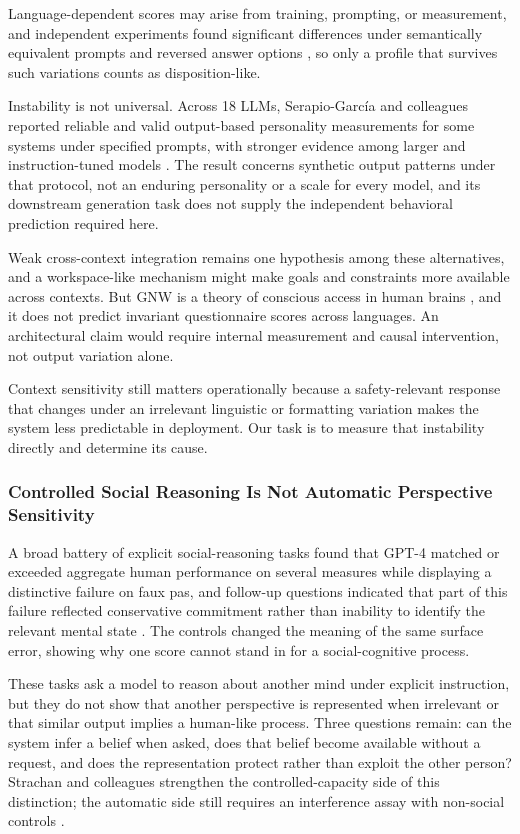 \documentclass{article}
\begin{document}
Language-dependent scores may arise from training, prompting, or measurement, and independent experiments found significant differences under semantically equivalent prompts and reversed answer options \citep{ref57}, so only a profile that survives such variations counts as disposition-like.

Instability is not universal. Across 18 LLMs, Serapio-Garc{\'i}a and colleagues reported reliable and valid output-based personality measurements for some systems under specified prompts, with stronger evidence among larger and instruction-tuned models \citep{ref78}. The result concerns synthetic output patterns under that protocol, not an enduring personality or a scale for every model, and its downstream generation task does not supply the independent behavioral prediction required here.

Weak cross-context integration remains one hypothesis among these alternatives, and a workspace-like mechanism might make goals and constraints more available across contexts. But GNW is a theory of conscious access in human brains \citep{ref12}, and it does not predict invariant questionnaire scores across languages. An architectural claim would require internal measurement and causal intervention, not output variation alone.

Context sensitivity still matters operationally because a safety-relevant response that changes under an irrelevant linguistic or formatting variation makes the system less predictable in deployment. Our task is to measure that instability directly and determine its cause.

\subsubsection{Controlled Social Reasoning Is Not Automatic Perspective Sensitivity}
A broad battery of explicit social-reasoning tasks found that GPT-4 matched or exceeded aggregate human performance on several measures while displaying a distinctive failure on faux pas, and follow-up questions indicated that part of this failure reflected conservative commitment rather than inability to identify the relevant mental state \citep{ref68}. The controls changed the meaning of the same surface error, showing why one score cannot stand in for a social-cognitive process.

These tasks ask a model to reason about another mind under explicit instruction, but they do not show that another perspective is represented when irrelevant or that similar output implies a human-like process. Three questions remain: can the system infer a belief when asked, does that belief become available without a request, and does the representation protect rather than exploit the other person? Strachan and colleagues strengthen the controlled-capacity side of this distinction; the automatic side still requires an interference assay with non-social controls \citep{ref53, ref66, ref68}.
\end{document}
